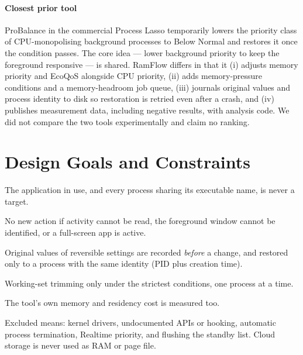 \documentclass[11pt]{article}
\begin{document}
\paragraph{Closest prior tool}
ProBalance in the commercial Process Lasso temporarily lowers the priority class of CPU-monopolising background processes to Below Normal and restores it once the condition passes\citep{probalance}. The core idea --- lower background priority to keep the foreground responsive --- is shared. RamFlow differs in that it (i) adjusts memory priority and EcoQoS alongside CPU priority, (ii) adds memory-pressure conditions and a memory-headroom job queue, (iii) journals original values and process identity to disk so restoration is retried even after a crash, and (iv) publishes measurement data, including negative results, with analysis code. We did not compare the two tools experimentally and claim no ranking.

\section{Design Goals and Constraints}
\label{sec:goals}

\begin{description}[leftmargin=2.2em,style=nextline,itemsep=2pt]
  \item[G1. Foreground first] The application in use, and every process sharing its executable name, is never a target.
  \item[G2. When uncertain, do nothing] No new action if activity cannot be read, the foreground window cannot be identified, or a full-screen app is active.
  \item[G3. Reversibility] Original values of reversible settings are recorded \emph{before} a change, and restored only to a process with the same identity (PID plus creation time).
  \item[G4. Minimal irreversible action] Working-set trimming only under the strictest conditions, one process at a time.
  \item[G5. Count our own cost] The tool's own memory and residency cost is measured too.
\end{description}

\noindent Excluded means: kernel drivers, undocumented APIs or hooking, automatic process termination, Realtime priority, and flushing the standby list. Cloud storage is never used as RAM or page file.

\end{document}
